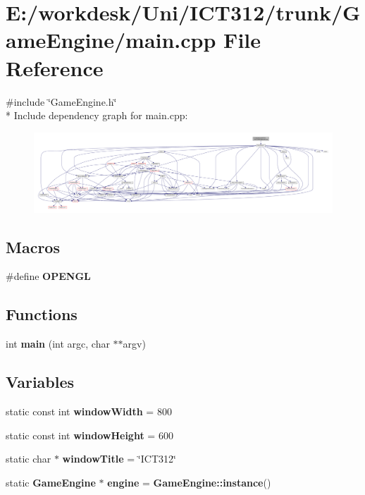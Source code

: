 \section{E\+:/workdesk/\+Uni/\+I\+C\+T312/trunk/\+Game\+Engine/main.cpp File Reference}
\label{main_8cpp}
{\ttfamily \#include \char`\"{}Game\+Engine.\+h\char`\"{}}\\*
Include dependency graph for main.\+cpp\+:\nopagebreak
\begin{figure}[H]
\begin{center}
\leavevmode
\includegraphics[width=350pt]{da/dce/main_8cpp__incl}
\end{center}
\end{figure}
\subsection*{Macros}
\begin{DoxyCompactItemize}
\item 
\#define {\bf O\+P\+E\+N\+G\+L}
\end{DoxyCompactItemize}
\subsection*{Functions}
\begin{DoxyCompactItemize}
\item 
int {\bf main} (int argc, char $\ast$$\ast$argv)
\end{DoxyCompactItemize}
\subsection*{Variables}
\begin{DoxyCompactItemize}
\item 
static const int {\bf window\+Width} = 800
\item 
static const int {\bf window\+Height} = 600
\item 
static char $\ast$ {\bf window\+Title} = \char`\"{}I\+C\+T312\char`\"{}
\item 
static {\bf Game\+Engine} $\ast$ {\bf engine} = {\bf Game\+Engine\+::instance}()
\end{DoxyCompactItemize}


